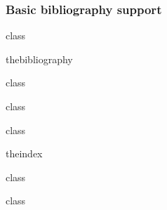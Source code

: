 \documentclass{skdoc}
\begin{document}
	\subsubsection{Basic bibliography support}
\begin{MacroCode}{class}
\newdimen\bibindent
\setlength\bibindent{2em}
\end{MacroCode}
	\begin{environment}{thebibliography}
\begin{MacroCode}{class}
\newenvironment{thebibliography}[1]
	{\section*{\refname}%
		\@mkboth{\MakeUppercase\refname}{\MakeUppercase\refname}%
		\list{\@biblabel{\@arabic\c@enumiv}}%
			{\settowidth\labelwidth{\@biblabel{#1}}%
				\leftmargin\labelwidth
				\advance\leftmargin\labelsep
				\@openbib@code
				\usecounter{enumiv}%
				\let\p@enumiv\@empty
				\renewcommand\theenumiv{\@arabic\c@enumiv}}%
		\sloppy
		\clubpenalty4000
		\@clubpenalty \clubpenalty
		\widowpenalty4000}%
	{\def\@noitemerr
		{\@latex@warning{Empty ‘thebibliography’ environment}}%
		\endlist}
\end{MacroCode}
	\end{environment}
	\begin{macro*}{\newblock}
\begin{MacroCode}{class}
\newcommand\newblock{\hskip .11em\@plus.33em\@minus.07em}
\end{MacroCode}
	\end{macro*}
\begin{MacroCode}{class}
\let\@openbib@code\@empty
\end{MacroCode}
	\begin{environment}{theindex}
\begin{MacroCode}{class}
\newenvironment{theindex}
	{\twocolumn[\section*{\indexname}]%
		\@mkboth{\MakeUppercase\indexname}%
			{\MakeUppercase\indexname}%
		\thispagestyle{plain}\parindent\z@
		\parskip\z@ \@plus .3\p@\relax
		\columnseprule \z@
		\columnsep 35\p@
		\let\item\@idxitem}
	{\onecolumn}
\end{MacroCode}
	\end{environment}
	\begin{macro*}{\@idxitem}
\begin{MacroCode}{class}
\newcommand\@idxitem{\par\hangindent 40\p@}
\end{MacroCode}
	\end{macro*}
\end{document}
